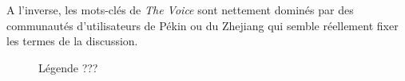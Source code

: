 A l{\textquoteright}inverse, les mots-cl\'es de \textit{The Voice} sont
nettement domin\'es par des communaut\'es d{\textquoteright}utilisateurs de P\'ekin ou du Zhejiang qui semble r\'eellement fixer les termes de la discussion.

\begin{figure}
    \centering

    \caption{
      Légende ???
    }
\end{figure}

